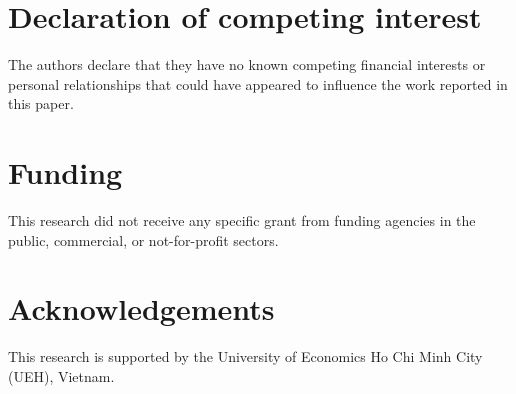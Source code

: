 \documentclass[final,times,twocolumn]{elsarticle}
\begin{document}
\section*{Declaration of competing interest}
The authors declare that they have no known competing financial interests or personal relationships that
could have appeared to influence the work reported in this paper.

\section*{Funding}
This research did not receive any specific grant from funding agencies in the public, commercial, or
not-for-profit sectors.

\section*{Acknowledgements}
This research is supported by the University of Economics Ho Chi Minh City (UEH), Vietnam.



\end{document}
